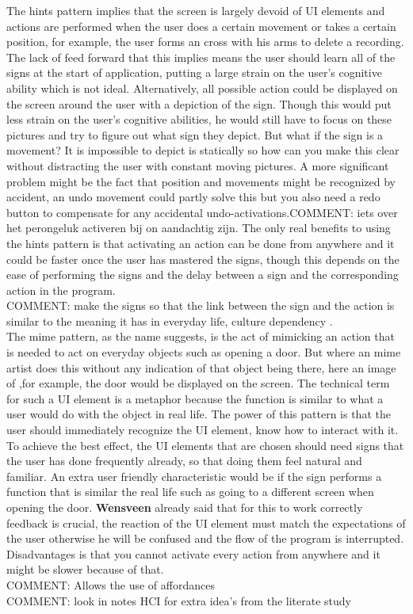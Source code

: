 The hints pattern implies that the screen is largely devoid of UI elements and actions are performed when the user does a certain movement or takes a certain position, for example, the user forms an cross with his arms to delete a recording.  The lack of feed forward that this implies means the user should learn all of the signs at the start of application, putting a large strain on the user's cognitive ability which is not ideal. Alternatively, all possible action could be displayed on the screen around the user with a depiction of the sign. Though this would put less strain on the user's cognitive abilities, he would still have to focus on these pictures and try to figure out what sign they depict. But what if the sign is a movement? It is impossible to depict is statically so how can you make this clear without distracting the user with constant moving pictures. A more significant problem might be the fact that position and movements might be recognized by accident, an undo movement could partly solve this but you also need a redo button to compensate for any accidental undo-activations.{\large COMMENT: iets over het perongeluk activeren bij on aandachtig zijn.}  The only real benefits to using the hints pattern is that activating an action can be done from anywhere and it could be faster once the user has mastered the signs, though this depends on the ease of performing the signs and the delay between a sign and the corresponding action in the program.\\
{\large COMMENT: make the signs so that the link between the sign and the action is similar to the meaning it has in everyday life, culture dependency .}\\

The mime pattern, as the name suggests, is the act of mimicking an action that is needed to act on everyday objects such as opening a door. But where an mime artist does this without any indication of that object being there, here an image of ,for example, the door would be displayed on the screen. The technical term for such a UI element is a metaphor because the function is similar to what a user would do with the object in real life. The power of this pattern is that the user should immediately recognize the UI element, know how to interact with it. To achieve the best effect, the UI elements that are chosen should need signs that the user has done frequently already, so that doing them feel natural and familiar. An extra user friendly characteristic would be if the sign performs a function that is similar the real life such as going to a different screen when opening the door. \textbf{Wensveen} already said that for this to work correctly feedback is crucial, the reaction of the UI element must match the expectations of the user otherwise he will be confused and the flow of the program is interrupted. Disadvantages is that you cannot activate every action from anywhere and it might be slower because of that.  \\
{\large COMMENT: Allows the use of affordances }  \\
{\large COMMENT: look in notes HCI for extra idea's from the literate study }\\



